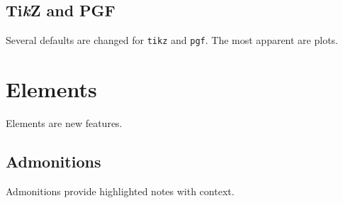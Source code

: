 \documentclass[10pt,titlepage]{article}
\newcommand*{\packagename}[1]{\texttt{#1}}
\begin{document}

\subsection{Ti\textit{k}Z and PGF}

Several defaults are changed for \packagename{tikz} and \packagename{pgf}.
The most apparent are plots.

{
\pgfplotsset{height=1.25\linewidth}
\begin{example}
\pgfplotsset{domain=0:1,samples=6}
\end{example}
}


\section{Elements}

Elements are new features.


\subsection{Admonitions}

Admonitions provide highlighted notes with context.
\end{document}
